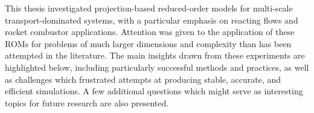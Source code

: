 This thesis investigated projection-based reduced-order models for  multi-scale transport-dominated systems, with a particular emphasis on reacting flows and rocket combustor applications. Attention was given to the application of these ROMs for problems of much larger dimensions and complexity than has been attempted in the literature. The main insights drawn from these experiments are highlighted below, including particularly successful methods and practices, as well as challenges which frustrated attempts at producing stable, accurate, and efficient simulations. A few additional questions which might serve as interesting topics for future research are also presented.